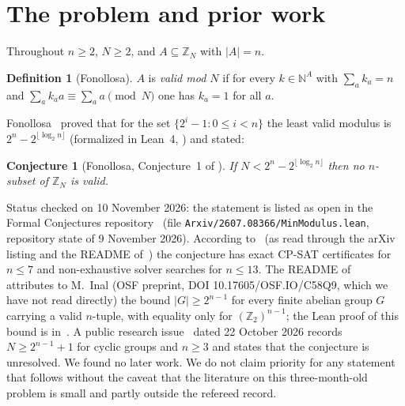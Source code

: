 \documentclass[11pt]{article}
\newtheorem{conjecture}[theorem]{Conjecture}
\theoremstyle{definition}
\newtheorem{definition}[theorem]{Definition}
\newcommand{\Z}{\mathbb{Z}}
\newcommand{\N}{\mathbb{N}}
\newcommand{\ZN}{\Z_N}
\begin{document}
\section{The problem and prior work}\label{sec:prior}
Throughout $n\ge 2$, $N\ge 2$, and $A\subseteq\ZN$ with $|A|=n$.
\begin{definition}[Fonollosa]
$A$ is \emph{valid mod $N$} if for every $k\in\N^{A}$ with $\sum_a k_a=n$ and $\sum_a k_a a\equiv\sum_a a \pmod N$ one has $k_a=1$ for all $a$.
\end{definition}
Fonollosa~\cite{F} proved that for the set $\{2^i-1:0\le i<n\}$ the least valid modulus is $2^n-2^{\lfloor\log_2 n\rfloor}$ (formalized in Lean~4, \cite{Frepo}) and stated:
\begin{conjecture}[Fonollosa, Conjecture~1 of \cite{F}]\label{conj:F}
If $N<2^n-2^{\lfloor \log_2 n\rfloor}$ then no $n$-subset of $\ZN$ is valid.
\end{conjecture}
\noindent Status checked on 10 November 2026: the statement is listed as open in the Formal Conjectures repository~\cite{FC} (file \texttt{Arxiv/2607.08366/MinModulus.lean}, repository state of 9 November 2026). According to~\cite{F} (as read through the arXiv listing and the README of~\cite{Frepo}) the conjecture has exact CP-SAT certificates for $n\le 7$ and non-exhaustive solver searches for $n\le 13$. The README of~\cite{Frepo} attributes to M.~Inal (OSF preprint, DOI 10.17605/OSF.IO/C58Q9, which we have not read directly) the bound $|G|\ge 2^{n-1}$ for every finite abelian group $G$ carrying a valid $n$-tuple, with equality only for $(\Z_2)^{n-1}$; the Lean proof of this bound is in~\cite{Frepo}. A public research issue~\cite{Om} dated 22 October 2026 records $N\ge 2^{n-1}+1$ for cyclic groups and $n\ge 3$ and states that the conjecture is unresolved. We found no later work. We do not claim priority for any statement that follows without the caveat that the literature on this three-month-old problem is small and partly outside the refereed record.
\end{document}
